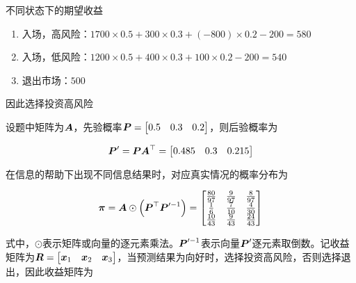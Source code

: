 \documentclass{../notes}
\begin{document}
    \begin{subquestions}
        \item 不同状态下的期望收益

        \begin{enumerate}[label=\arabic*.]
            \item 入场，高风险：$1700\times 0.5 + 300\times 0.3 + (-800)\times 0.2 - 200 = 580$
            \item 入场，低风险：$1200\times 0.5 + 400\times 0.3 + 100\times 0.2 - 200 = 540$
            \item 退出市场：$500$
        \end{enumerate}

        因此选择投资高风险

        \item 设题中矩阵为$\boldsymbol A$，先验概率$\boldsymbol P = \begin{bmatrix}0.5 & 0.3 & 0.2\end{bmatrix}$，则后验概率为

        \begin{equation}
            \boldsymbol P' = \boldsymbol P\boldsymbol A^\top = \begin{bmatrix}
                0.485 & 0.3 & 0.215
            \end{bmatrix}
        \end{equation}

        在信息的帮助下出现不同信息结果时，对应真实情况的概率分布为

        \begin{equation}
            \boldsymbol \pi = \boldsymbol A\odot \left(\boldsymbol P^\top \boldsymbol P'^{-1}\right) = \begin{bmatrix}
                \frac{80}{97} & \frac{9}{97} & \frac{8}{97} \\
                \frac{1}{6} & \frac{7}{10} & \frac{4}{30} \\
                \frac{10}{43} & \frac{9}{43} & \frac{24}{43} \\
            \end{bmatrix}
        \end{equation}

        式中，$\odot$表示矩阵或向量的逐元素乘法。$\boldsymbol P'^{-1}$表示向量$\boldsymbol P'$逐元素取倒数。记收益矩阵为$\boldsymbol R = \begin{bmatrix} \boldsymbol x_1 & \boldsymbol x_2 & \boldsymbol x_3 \end{bmatrix}$，当预测结果为向好时，选择投资高风险，否则选择退出，因此收益矩阵为


\end{subquestions}
\end{document}
